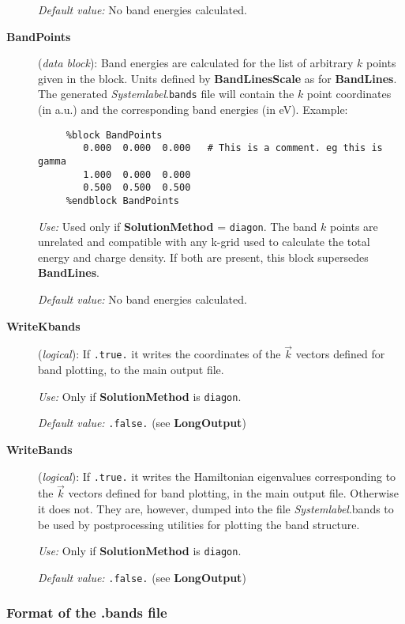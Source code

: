 \documentclass[11pt]{article}
\begin{document}
\begin{description}
{\it Default value:} No band energies calculated.

\item[{\bf BandPoints}] ({\it data block}): 
Band energies are calculated for the list of arbitrary $k$ points 
given in the block. Units defined by {\bf BandLinesScale} as 
for {\bf BandLines}. The generated {\it Systemlabel}.{\tt bands} file
will contain the $k$ point coordinates (in a.u.) and the corresponding
band energies (in eV). Example:

\begin{verbatim}
     %block BandPoints
        0.000  0.000  0.000   # This is a comment. eg this is gamma
        1.000  0.000  0.000 
        0.500  0.500  0.500   
     %endblock BandPoints
\end{verbatim}

{\it Use:} Used only if {\bf SolutionMethod} = {\tt diagon}.
The band $k$ points are unrelated and compatible with any k-grid used
to calculate the total energy and charge density. If both are present, this 
block supersedes {\bf BandLines}.

{\it Default value:} No band energies calculated.

\item[{\bf WriteKbands}] ({\it logical}):
If {\tt .true.} it writes the coordinates of the $\vec k$ vectors
defined for band plotting, to the main output file.

{\it Use:} Only if {\bf SolutionMethod} is {\tt diagon}.

{\it Default value:} {\tt .false.} (see {\bf LongOutput})


\item[{\bf WriteBands}] ({\it logical}):  If {\tt .true.} it
  writes the Hamiltonian eigenvalues corresponding to the $\vec k$
  vectors defined for band plotting, in the main output file.
  Otherwise it does not. They are, however, dumped into the file {\it
    Systemlabel}.bands to be used by postprocessing utilities for
  plotting the band structure.

{\it Use:} Only if {\bf SolutionMethod} is {\tt diagon}.
 
{\it Default value:} {\tt .false.} (see {\bf LongOutput})


\end{description}

\subsubsection{Format of the .bands file}
\end{document}
